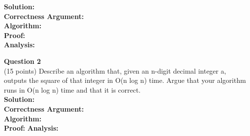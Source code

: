 \documentclass[11pt]{article}
\begin{document}
\textbf{Solution:}\\
\textbf{Correctness Argument:}\\
\textbf{Algorithm:}\\
\textbf{Proof:}\\
\textbf{Analysis:}\\
\clearpage


\textbf{Question 2}\\
(15 points) Describe an algorithm that, given an n-digit decimal integer a, outputs the square of that
integer in O(n log n) time. Argue that your algorithm runs in O(n log n) time and that it is correct. \\
\textbf{Solution:}\\
\textbf{Correctness Argument:}\\
\textbf{Algorithm:}\\
\textbf{Proof:}
\textbf{Analysis:}\\
\clearpage
\end{document}

